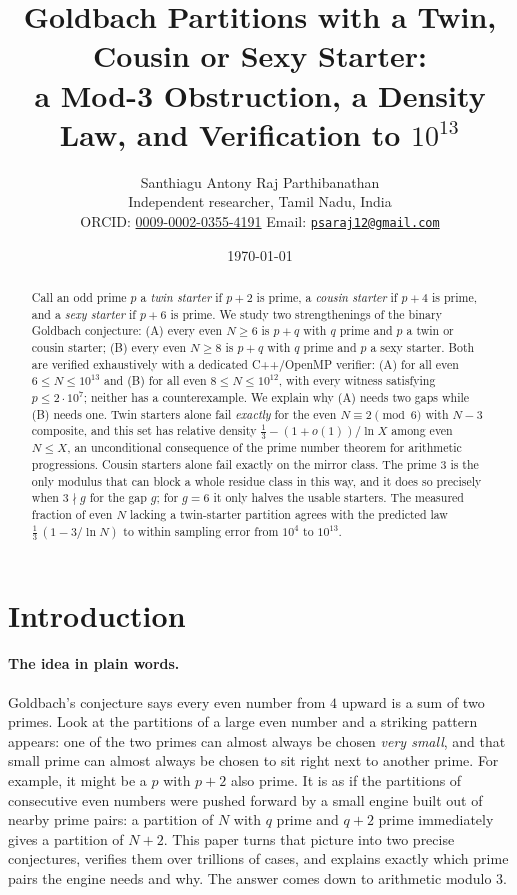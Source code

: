 \documentclass[11pt]{article}
\title{Goldbach Partitions with a Twin, Cousin or Sexy Starter:\\
a Mod-3 Obstruction, a Density Law, and Verification to $10^{13}$}
\author{Santhiagu Antony Raj Parthibanathan\\
\small Independent researcher, Tamil Nadu, India\\
\small ORCID: \href{https://orcid.org/0009-0002-0355-4191}{0009-0002-0355-4191}
\quad Email: \href{mailto:psaraj12@gmail.com}{\texttt{psaraj12@gmail.com}}}
\date{\today}
\theoremstyle{definition}
\theoremstyle{remark}
\begin{document}
\maketitle

\begin{abstract}
Call an odd prime $p$ a \emph{twin starter} if $p+2$ is prime, a \emph{cousin
starter} if $p+4$ is prime, and a \emph{sexy starter} if $p+6$ is prime. We
study two strengthenings of the binary Goldbach conjecture: (A) every even
$N\ge 6$ is $p+q$ with $q$ prime and $p$ a twin or cousin starter; (B) every
even $N\ge 8$ is $p+q$ with $q$ prime and $p$ a sexy starter. Both are verified
exhaustively with a dedicated C++/OpenMP verifier: (A) for all even
$6\le N\le 10^{13}$ and (B) for all even $8\le N\le 10^{12}$, with every witness
satisfying $p\le 2\cdot 10^7$; neither has a counterexample. We explain why
(A) needs two gaps while (B) needs one. Twin starters alone fail
\emph{exactly} for the even $N\equiv 2\pmod 6$ with $N-3$ composite, and this
set has relative density $\tfrac13-(1+o(1))/\ln X$ among even $N\le X$, an
unconditional consequence of the prime number theorem for arithmetic
progressions. Cousin starters alone fail exactly on the mirror class. The
prime $3$ is the only modulus that can block a whole residue class in this
way, and it does so precisely when $3\nmid g$ for the gap $g$; for $g=6$ it
only halves the usable starters. The measured fraction of even $N$ lacking a
twin-starter partition agrees with the predicted law
$\tfrac13\,(1-3/\ln N)$ to within sampling error from $10^4$ to $10^{13}$.
\end{abstract}

\section{Introduction}

\paragraph{The idea in plain words.}
Goldbach's conjecture says every even number from $4$ upward is a sum of two
primes. Look at the partitions of a large even number and a striking pattern
appears: one of the two primes can almost always be chosen \emph{very small},
and that small prime can almost always be chosen to sit right next to another
prime. For example, it might be a $p$ with $p+2$ also prime. It is as if the
partitions of consecutive even numbers were pushed forward by a small engine
built out of nearby prime pairs: a partition of $N$ with $q$ prime and $q+2$
prime immediately gives a partition of $N+2$. This paper turns that picture
into two precise conjectures, verifies them over trillions of cases, and
explains exactly which prime pairs the engine needs and why. The answer
comes down to arithmetic modulo $3$.
\end{document}
